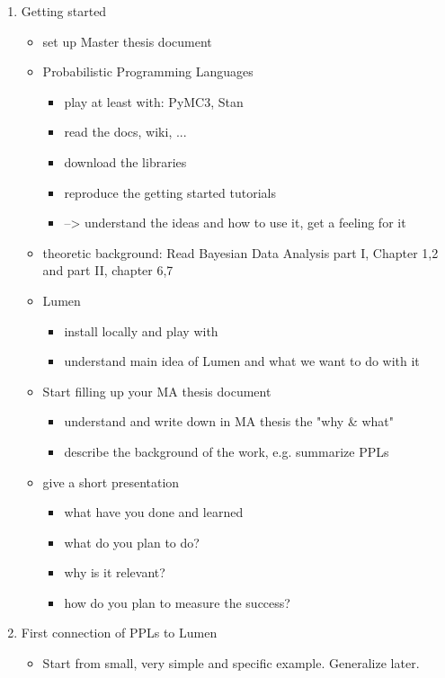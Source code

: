 \documentclass{article}
\begin{document}
\begin{enumerate}
	\item Getting started
	\begin{itemize}
		\item set up Master thesis document
		\item Probabilistic Programming Languages
		\begin{itemize}
			\item play at least with: PyMC3, Stan
			\item read the docs, wiki, ...
			\item download the libraries
			\item reproduce the getting started tutorials
			\item --> understand the ideas and how to use it, get a feeling for it
		\end{itemize}
		\item theoretic background: Read Bayesian Data Analysis part I, Chapter 1,2 and part II, chapter 6,7
		\item Lumen
		\begin{itemize}
			\item install locally and play with
			\item understand main idea of Lumen and what we want to do with it
		\end{itemize}
		\item Start filling up your MA thesis document
		\begin{itemize}
			\item understand and write down in MA thesis the "why \& what"
			\item describe the background of the work, e.g. summarize PPLs
		\end{itemize}
		\item give a short presentation
		\begin{itemize}
			\item what have you done and learned
			\item what do you plan to do?
			\item why is it relevant?
			\item how do you plan to measure the success?
		\end{itemize}	
	\end{itemize}
	\item First connection of PPLs to Lumen
	\begin{itemize}
		\item Start from small, very simple and specific example. Generalize later.

\end{itemize}
\end{enumerate}
\end{document}
